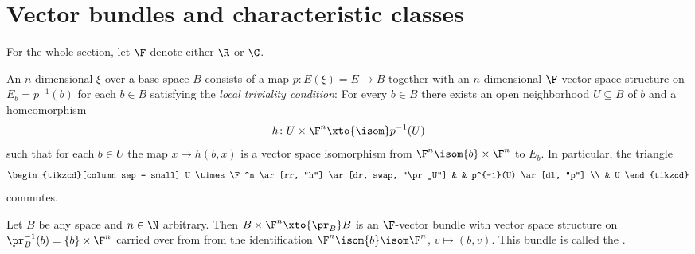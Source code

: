 \section{Vector bundles and characteristic classes}
For the whole section, let $\F$ denote either $\R$ or $\C$.
\begin{definition}
	An $n$-dimensional  $\xi$ over a base space $B$ consists of a map $p\colon E(\xi) = E \to B$ together with an $n$-dimensional $\F$-vector space structure on $E_b = p^{-1}(b)$ for each $b \in B$ satisfying the \emph{local triviality condition}:
	For every $b \in B$ there exists an open neighborhood $U \subseteq B$ of $b$ and a homeomorphism
	\begin{equation*}
		h\colon U \times \F^n \xto{\isom} p^{-1}(U)
	\end{equation*}
	such that for each $b \in U$ the map $x \mapsto h(b, x)$ is a vector space isomorphism from $\F^n \isom \{b\} \times \F^n$ to $E_b$.
	In particular, the triangle
	\begin{equation*}
		\begin{tikzcd}[column sep = small]
			U \times \F^n 
					\ar[rr, "h"]
					\ar[dr, swap, "\pr_U"]
				& & p^{-1}(U)
					\ar[dl, "p"]
			\\
				& U
		\end{tikzcd}
	\end{equation*}
	commutes.
\end{definition}
\begin{example}
	Let $B$ be any space and $n \in \N$ arbitrary.
	Then $B \times \F^n \xto{\pr_B} B$ is an $\F$-vector bundle with vector space structure on $\pr_B^{-1}(b) = \{b\} \times \F^n$ carried over from from the identification $\F^n \isom \{b\} \isom \F^n$, $v \mapsto (b, v)$.
	This bundle is called the .
\end{example}
